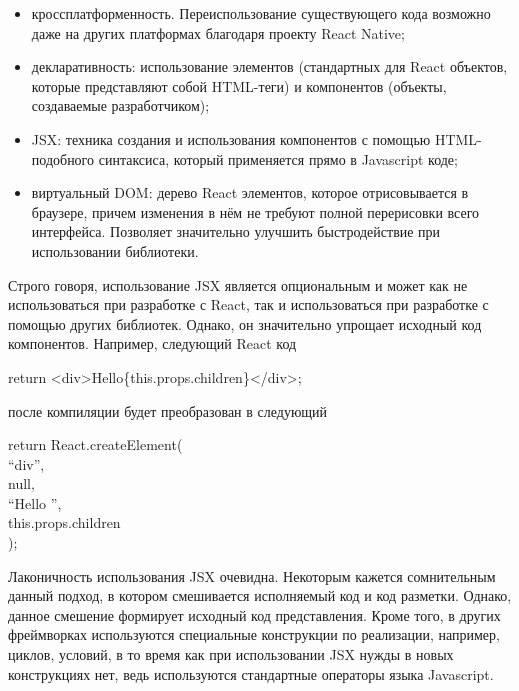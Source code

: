 \begin{itemize}
  \item кроссплатформенность. Переиспользование существующего кода \linebreak возможно даже на других платформах
  благодаря проекту React Native;
  \item декларативность: использование элементов (стандартных для React объектов, которые представляют собой HTML-теги)
  и компонентов (объекты, создаваемые разработчиком);
  \item JSX: техника создания и использования компонентов с помощью \linebreak HTML-подобного синтаксиса, который применяется
  прямо в Javascript коде;
  \item виртуальный DOM: дерево React элементов, которое отрисовывается в браузере, причем изменения в нём не требуют
  полной перерисовки всего интерфейса. Позволяет значительно улучшить быстродействие при использовании библиотеки.
\end{itemize}

Строго говоря, использование JSX является опциональным и может как не использоваться при разработке с React, так и
использоваться при разработке с помощью других библиотек. Однако, он значительно упрощает исходный код компонентов.
Например, следующий React код

\begin{flushleft}
  \qquad\qquad\qquad return <div>Hello\{this.props.children\}</div>;
  \end{flushleft}
  после компиляции будет преобразован в следующий
  \begin{flushleft}
  \qquad\qquad\qquad return React.createElement(\\
  \qquad\qquad\qquad\qquad ``div'',\\
  \qquad\qquad\qquad\qquad null,\\
  \qquad\qquad\qquad\qquad ``Hello '',\\
  \qquad\qquad\qquad\qquad this.props.children\\
  \qquad\qquad\qquad );
\end{flushleft}

Лаконичность использования JSX очевидна. Некоторым кажется сомнительным данный подход, в котором смешивается
исполняемый код и код разметки. Однако, данное смешение формирует исходный код представления. Кроме того, в других
фреймворках используются специальные конструкции по реализации, например, циклов, условий, в то время как при
использовании JSX нужды в новых конструкциях нет, ведь используются стандартные операторы языка Javascript.

